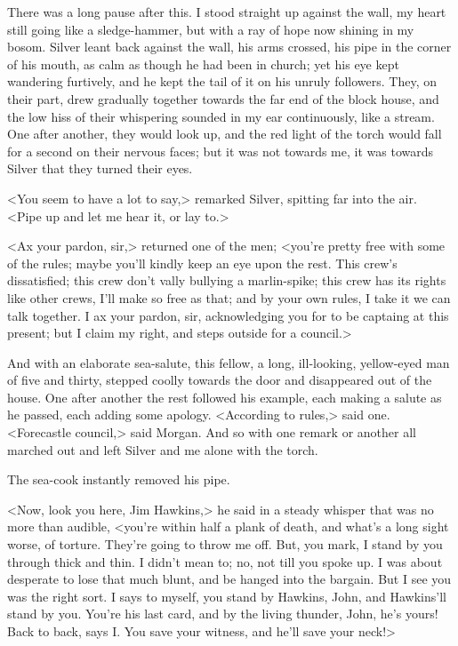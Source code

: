 There was a long pause after this. I stood straight up against the wall, my heart still going like a sledge-hammer, but with a ray of hope now shining in my bosom. Silver leant back against the wall, his arms crossed, his pipe in the corner of his mouth, as calm as though he had been in church; yet his eye kept wandering furtively, and he kept the tail of it on his unruly followers. They, on their part, drew gradually together towards the far end of the block house, and the low hiss of their whispering sounded in my ear continuously, like a stream. One after another, they would look up, and the red light of the torch would fall for a second on their nervous faces; but it was not towards me, it was towards Silver that they turned their eyes.

<You seem to have a lot to say,> remarked Silver, spitting far into the air. <Pipe up and let me hear it, or lay to.>

<Ax your pardon, sir,> returned one of the men; <you're pretty free with some of the rules; maybe you'll kindly keep an eye upon the rest. This crew's dissatisfied; this crew don't vally bullying a marlin-spike; this crew has its rights like other crews, I'll make so free as that; and by your own rules, I take it we can talk together. I ax your pardon, sir, acknowledging you for to be captaing at this present; but I claim my right, and steps outside for a council.>

And with an elaborate sea-salute, this fellow, a long, ill-looking, yellow-eyed man of five and thirty, stepped coolly towards the door and disappeared out of the house. One after another the rest followed his example, each making a salute as he passed, each adding some apology. <According to rules,> said one. <Forecastle council,> said Morgan. And so with one remark or another all marched out and left Silver and me alone with the torch.

The sea-cook instantly removed his pipe.

<Now, look you here, Jim Hawkins,> he said in a steady whisper that was no more than audible, <you're within half a plank of death, and what's a long sight worse, of torture. They're going to throw me off. But, you mark, I stand by you through thick and thin. I didn't mean to; no, not till you spoke up. I was about desperate to lose that much blunt, and be hanged into the bargain. But I see you was the right sort. I says to myself, you stand by Hawkins, John, and Hawkins'll stand by you. You're his last card, and by the living thunder, John, he's yours! Back to back, says I\@. You save your witness, and he'll save your neck!>

